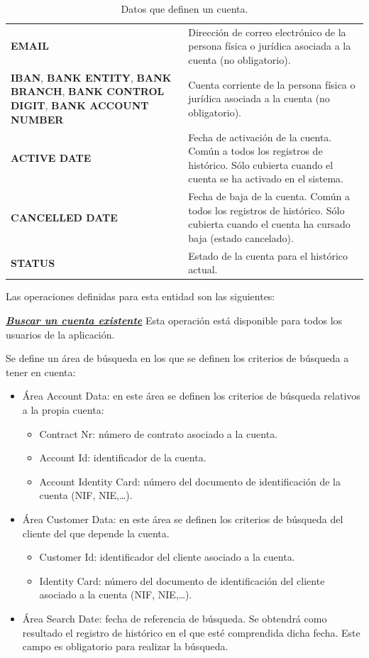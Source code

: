 \begin{table}[H]
{\begin{tabular}{|m{6cm} m{8cm}|}
	\textbf{EMAIL} & Dirección de correo electrónico de la persona física o jurídica asociada a la cuenta (no obligatorio).\\
	\textbf{IBAN}, \textbf{BANK ENTITY}, \textbf{BANK BRANCH}, \textbf{BANK CONTROL DIGIT}, \textbf{BANK ACCOUNT NUMBER} & Cuenta corriente de la persona física o jurídica asociada a la cuenta (no obligatorio).\\
	\textbf{ACTIVE DATE} & Fecha de activación de la cuenta. Común a todos los registros de histórico. Sólo cubierta cuando el cuenta se ha activado en el sistema.\\	
	\textbf{CANCELLED DATE} & Fecha de baja de la cuenta. Común a todos los registros de histórico. Sólo cubierta cuando el cuenta ha cursado baja (estado cancelado).	\\
	\textbf{STATUS} & Estado de la cuenta para el histórico actual.	
	\\\hline
  \end{tabular}
  } %
  \caption{Datos que definen un cuenta.}
  \label{tab:cuenta}
\end{table}



Las operaciones definidas para esta entidad son las siguientes:


\underline{\textsl{\textbf{Buscar un cuenta existente}}}\newline
Esta operación está disponible para todos los usuarios de la aplicación.

Se define un área de búsqueda en los que se definen los criterios de búsqueda a tener en cuenta:
\begin{itemize}
	\item Área Account Data: en este área se definen los criterios de búsqueda relativos a la propia cuenta:
	\begin{itemize}
		\item Contract Nr: número de contrato asociado a la cuenta.
		\item Account Id: identificador de la cuenta.
		\item Account Identity Card: número del documento de identificación de la cuenta (NIF, NIE,\dots).
	\end{itemize}
	\item Área Customer Data: en este área se definen los criterios de búsqueda del cliente del que depende la cuenta.
	\begin{itemize}
		\item Customer Id: identificador del cliente asociado a la cuenta.
		\item Identity Card: número del documento de identificación del cliente asociado a la cuenta (NIF, NIE,\dots).
	\end{itemize}
	\item Área Search Date: fecha de referencia de búsqueda. Se obtendrá como resultado el registro de histórico en el que esté comprendida dicha fecha. Este campo es obligatorio para realizar la búsqueda.
\end{itemize}

